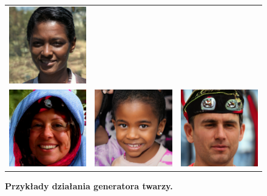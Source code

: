 \begin{figure}[H]
\begin{center}
\begin{tabular}{ccc}
      \includegraphics[width=.3\linewidth]{img/gen/6.png} \\
      \includegraphics[width=.3\linewidth]{img/gen/7.png} &
      \includegraphics[width=.3\linewidth]{img/gen/8.png} &
      \includegraphics[width=.3\linewidth]{img/gen/9.png} \\
    \end{tabular}
    \end{center}
    \caption{{\bf Przykłady działania generatora twarzy.}}
    \label{fig:generator_twarzy}
    \end{figure}




